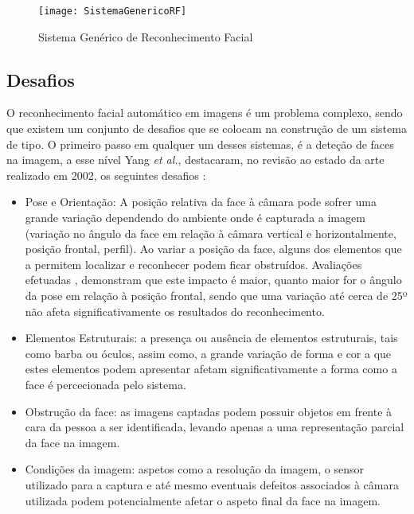 \begin{figure}[ht]
  \begin{center}
    \leavevmode
    \texttt{[image: SistemaGenericoRF]}
    \caption{Sistema Genérico de Reconhecimento Facial}
    \label{fig:genericRF}
  \end{center}
\end{figure}

\subsection{Desafios} \label{desafios}
O reconhecimento facial automático em imagens é um problema complexo, sendo que existem um conjunto de desafios que se colocam na construção de um sistema de tipo. O primeiro passo em qualquer um desses sistemas, é a deteção de faces na imagem, a esse nível Yang \textit{et al.}, destacaram, no revisão ao estado da arte realizado em 2002,  os seguintes desafios \cite{Yang2002}:
\begin{itemize}
\item Pose e Orientação: A posição relativa da face à câmara pode sofrer uma grande variação dependendo do ambiente onde é capturada a imagem (variação no ângulo da face em relação à câmara vertical e horizontalmente, posição frontal, perfil). Ao variar a posição da face, alguns dos elementos que a permitem localizar e reconhecer podem ficar obstruídos. Avaliações efetuadas \cite{BlackburnDuaneM.;BoneMike;Phillips2001}, demonstram que este impacto é maior, quanto maior for o ângulo da pose em relação à posição frontal, sendo que uma variação até cerca de 25º não afeta significativamente os resultados do reconhecimento.
\item  Elementos Estruturais: a presença ou ausência de elementos estruturais, tais como barba ou óculos, assim como, a grande variação de forma e cor a que estes elementos podem apresentar afetam significativamente a forma como a face é percecionada pelo sistema.
\item Obstrução da face: as imagens captadas podem possuir objetos em frente à cara da pessoa a ser identificada, levando apenas a uma representação parcial da face na imagem.
\item Condições da imagem: aspetos como a resolução da imagem, o sensor utilizado para a captura e até mesmo eventuais defeitos associados à câmara utilizada podem potencialmente afetar o aspeto final da face na imagem.
\end{itemize}

